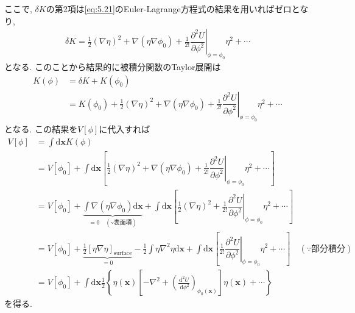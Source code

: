 \documentclass[dvipdfmx,11pt,a4paper,oneside,openany]{jsbook}
\begin{document}
ここで, $\delta K$の第2項は\eqref{eq:5.21}のEuler-Lagrange方程式の結果を用いればゼロとなり,
\begin{align*}
    \delta K=\frac{1}{2}(\nabla\eta)^2+\nabla(\eta\nabla\phi_0)+\frac{1}{2!}\left.\dfrac{\partial^2 U}{\partial \phi^2}\right|_{\phi=\phi_0}\eta^2+\cdots
\end{align*}
となる. このことから結果的に被積分関数のTaylor展開は
\begin{align*}
    K(\phi) & =\delta K+K(\phi_0)                                                                                                                                     \\
            & =K(\phi_0)+\frac{1}{2}(\nabla\eta)^2+\nabla(\eta\nabla\phi_0)+\frac{1}{2!}\left.\dfrac{\partial^2 U}{\partial \phi^2}\right|_{\phi=\phi_0}\eta^2+\cdots
\end{align*}
となる. この結果を$V[\phi]$に代入すれば
\begin{align}
    V[\phi] & =\int\mathrm{d}\bm{x} K(\phi)\nonumber                                                                                                                                                                                                                                                                               \\
            & =V[\phi_0]+\int\mathrm{d}\bm{x}\left[\frac{1}{2}(\nabla\eta)^2+\nabla(\eta\nabla\phi_0)+\frac{1}{2!}\left.\dfrac{\partial^2 U}{\partial \phi^2}\right|_{\phi=\phi_0}\eta^2+\cdots\right] \nonumber                                                                                                                   \\
            & =V[\phi_0]+\underbrace{\int\nabla(\eta\nabla\phi_0)\mathrm{d}\bm{x}}_{=0\quad (\because \text{表面項})}+\int\mathrm{d}\bm{x}\left[\frac{1}{2}(\nabla\eta)^2+\frac{1}{2!}\left.\dfrac{\partial^2 U}{\partial \phi^2}\right|_{\phi=\phi_0}\eta^2+\cdots\right]\nonumber                                                \\
            & =V[\phi_0]+\underbrace{\frac{1}{2}\left[\eta\nabla\eta\right]_{\text{surface}}}_{=0}-\frac{1}{2}\int\eta\nabla^2\eta\mathrm{d}\bm{x}+\int\mathrm{d}\bm{x}\left[\frac{1}{2!}\left.\dfrac{\partial^2 U}{\partial \phi^2}\right|_{\phi=\phi_0}\eta^2+\cdots\right]\quad \left(\because \text{部分積分}\right) \nonumber \\
            & =V\left[\phi_{0}\right]+\int \mathrm{d} \bm{x} \frac{1}{2}\left\{\eta(\boldsymbol{x})\left[-\nabla^{2}+\left(\frac{\mathrm{d}^{2} U}{\mathrm{~d} \phi^{2}}\right)_{\phi_{0}(\boldsymbol{x})}\right] \eta(\boldsymbol{x})+\cdots\right\}
\end{align}
を得る.

\end{document}
